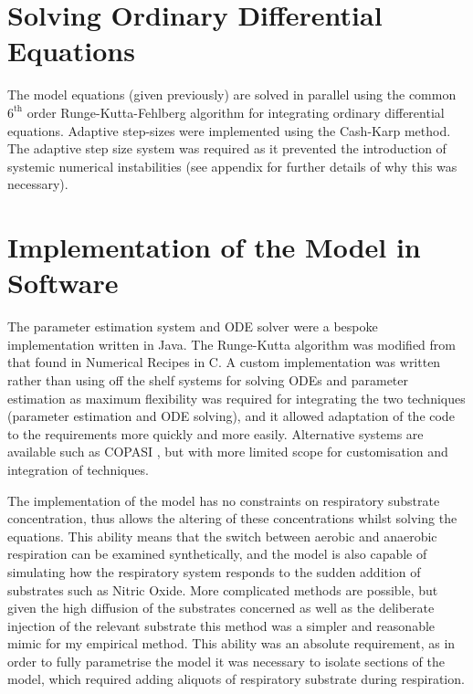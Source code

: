 \section{Solving Ordinary Differential Equations}
The model equations (given previously) are solved in parallel using the common $\mathrm{6}^\mathrm{th}$ order Runge-Kutta-Fehlberg algorithm for integrating ordinary differential equations\cite{Butcher2003}. Adaptive step-sizes were implemented using the Cash-Karp method\cite{Cash1990}. The adaptive step size system was required as it prevented the introduction of systemic numerical instabilities (see appendix for further details of why this was necessary).


\section{Implementation of the Model in Software}
The parameter estimation system and ODE solver were a bespoke implementation written in Java. The Runge-Kutta algorithm was modified from that found in Numerical Recipes in C\cite{Press1992}. A custom implementation was written rather than using off the shelf systems for solving ODEs and parameter estimation as maximum flexibility was required for integrating the two techniques (parameter estimation and ODE solving), and it allowed adaptation of the code to the requirements more quickly and more easily. Alternative systems are available such as COPASI \cite{Hoops2006}, but with more limited scope for customisation and integration of techniques.

The implementation of the model has no constraints on respiratory substrate concentration, thus allows the altering of these concentrations whilst solving the equations. %
This ability means that the switch between aerobic and anaerobic respiration can be examined synthetically, and the model is also capable of simulating how the respiratory system responds to the sudden addition of substrates such as Nitric Oxide. More complicated methods are possible, but given the high diffusion of the substrates concerned as well as the deliberate injection of the relevant substrate this method was a simpler and reasonable mimic for my empirical method. This ability was an absolute requirement, as in order to fully parametrise the model it was necessary to isolate sections of the model, which required adding aliquots of respiratory substrate during respiration.

